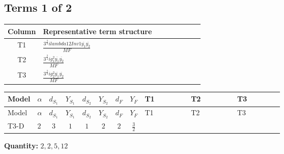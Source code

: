 \documentclass[8pt]{article}
\begin{document}
\begin{landscape}
\subsection*{Terms 1 of 2}
\begin{center}
\begin{tabular}{@{}c >{\raggedright\arraybackslash}p{0.82\linewidth}@{}}
\toprule
Column & Representative term structure \\
\midrule
T1 & \(\displaystyle \frac{3^{\frac{3}{4}} i lambda12Inv1 \overline{y_{1}} \overline{y_{2}}}{MF}\) \\
\midrule
T2 & \(\displaystyle \frac{3^{\frac{3}{4}} i g_{1}^{2} \overline{y_{1}} \overline{y_{2}}}{MF}\) \\
\midrule
T3 & \(\displaystyle \frac{3^{\frac{3}{4}} i g_{2}^{2} \overline{y_{1}} \overline{y_{2}}}{MF}\) \\
\midrule
\bottomrule
\end{tabular}
\end{center}
\smallskip
\tiny
\begin{longtable}{@{}llcccccc >{\raggedright\arraybackslash}p{0.21\linewidth} >{\raggedright\arraybackslash}p{0.21\linewidth} >{\raggedright\arraybackslash}p{0.21\linewidth}@{}}
\toprule
Model & $\alpha$ & $d_{S_1}$ & $Y_{S_1}$ & $d_{S_2}$ & $Y_{S_2}$ & $d_F$ & $Y_F$ & T1 & T2 & T3 \\
\midrule
\endfirsthead
\toprule
Model & $\alpha$ & $d_{S_1}$ & $Y_{S_1}$ & $d_{S_2}$ & $Y_{S_2}$ & $d_F$ & $Y_F$ & T1 & T2 & T3 \\
\midrule
\endhead
T3-D & $2$ & $3$ & $1$ & $1$ & $2$ & $2$ & $\frac{3}{2}$ & \scriptsize\adjustbox{max width=\linewidth}{$\begin{gathered} \frac{3^{\frac{3}{4}} i lambda12Inv1 \overline{y_{1}} \overline{y_{2}}}{6 MF}\end{gathered}$} & \scriptsize\adjustbox{max width=\linewidth}{$\begin{gathered} \frac{9 \cdot 3^{\frac{3}{4}} i g_{1}^{2} \overline{y_{1}} \overline{y_{2}}}{8 MF}\end{gathered}$} & \scriptsize\adjustbox{max width=\linewidth}{$\begin{gathered} \frac{11 \cdot 3^{\frac{3}{4}} i g_{2}^{2} \overline{y_{1}} \overline{y_{2}}}{8 MF}\end{gathered}$} \\
\midrule
\bottomrule
\end{longtable}
\clearpage
\noindent\textbf{Quantity: }$\mathrm{2,2,5,12}$\par\smallskip

\end{landscape}
\end{document}
